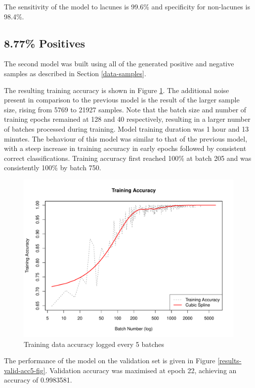 The sensitivity of the model to lacunes is 99.6\% and specificity for non-lacunes is 98.4\%.

\subsection*{8.77\% Positives}

The second model was built using all of the generated positive and negative samples as described in Section \ref{data-samples}.

The resulting training accuracy is shown in Figure \ref{results-train-acc5-fig}. The additional noise present in comparison to the previous model is the result of the larger sample size, rising from 5769 to 21927 samples. Note that the batch size and number of training epochs remained at 128 and 40 respectively, resulting in a larger number of batches processed during training. Model training duration was 1 hour and 13 minutes. The behaviour of this model was similar to that of the previous model, with a steep increase in training accuracy in early epochs followed by consistent correct classifications. Training accuracy first reached 100\% at batch 205 and was consistently 100\% by batch 750. 

\begin{figure}[ht]
	\centering
	\includegraphics[width=\textwidth]{Images/7_train_acc5.pdf}
	\caption{Training data accuracy logged every 5 batches}
	\label{results-train-acc5-fig}
\end{figure}

The performance of the model on the validation set is given in Figure \ref{results-valid-acc5-fig}. Validation accuracy was maximised at epoch 22, achieving an accuracy of 0.9983581. 

